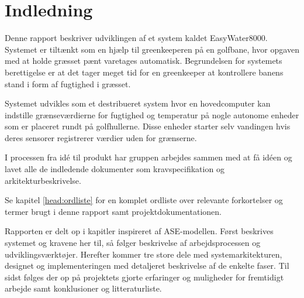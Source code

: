 \chapter{Indledning}

Denne rapport beskriver udviklingen af et system kaldet EasyWater8000. Systemet er tiltænkt som en hjælp til greenkeeperen på en golfbane, hvor opgaven med at holde græsset pænt varetages automatisk. Begrundelsen for systemets berettigelse er at det tager meget tid for en greenkeeper at kontrollere banens stand i form af fugtighed i græsset.

Systemet udvikles som et destribueret system hvor en hovedcomputer kan indstille grænseværdierne for fugtighed og temperatur på nogle autonome enheder som er placeret rundt på golfhullerne. Disse enheder starter selv vandingen hvis deres sensorer registrerer værdier uden for grænserne.

I processen fra idé til produkt har gruppen arbejdes sammen med at få idéen og lavet alle de indledende dokumenter som kravspecifikation og arkitekturbeskrivelse.

Se kapitel \ref{head:ordliste} for en komplet ordliste over relevante forkortelser og termer brugt i denne rapport samt projektdokumentationen.

Rapporten er delt op i kapitler inspireret af ASE-modellen. Først beskrives systemet og kravene her til, så følger beskrivelse af arbejdsprocessen og udviklingsværktøjer.
Herefter kommer tre store dele med systemarkitekturen, designet og implementeringen med detaljeret beskrivelse af de enkelte faser. Til sidst følges der op på projektets gjorte erfaringer og muligheder for fremtidigt arbejde samt konklusioner og litteraturliste.